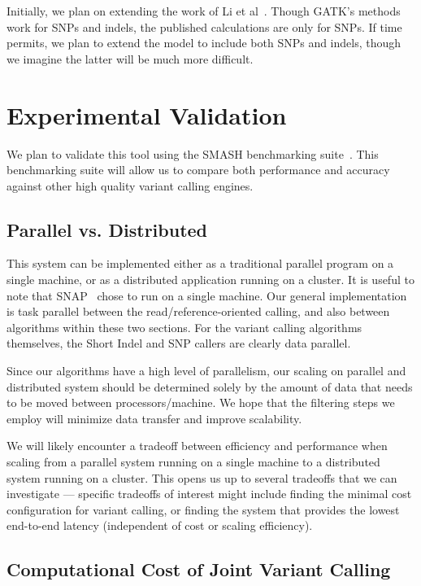 \documentclass[11pt]{article}
\begin{document}
Initially, we plan on extending the work of Li et al~\cite{li11}. Though GATK's methods work for SNPs and indels, the published calculations
are only for SNPs. If time permits, we plan to extend the model to include both SNPs and indels, though we imagine the latter will be much
more difficult.

\section{Experimental Validation}
\label{sec:experimental-validation}

We plan to validate this tool using the SMASH benchmarking suite~\cite{talwalkar13}. This benchmarking suite will allow us to
compare both performance and accuracy against other high quality variant calling engines.

\subsection{Parallel vs. Distributed}
\label{sec:parallel-vs-distributed}

This system can be implemented either as a traditional parallel program on a single machine, or as a distributed application
running on a cluster. It is useful to note that SNAP~\cite{zaharia11} chose to run on a single machine. Our general implementation
is task parallel between the read/reference-oriented calling, and also between algorithms within these two sections. For the
variant calling algorithms themselves, the Short Indel and SNP callers are clearly data parallel.

Since our algorithms have a high level of parallelism, our scaling on parallel and distributed system should be determined solely
by the amount of data that needs to be moved between processors/machine. We hope that the filtering steps we employ will
minimize data transfer and improve scalability.

We will likely encounter a tradeoff between efficiency and performance when scaling from a parallel system running on a single
machine to a distributed system running on a cluster. This opens us up to several tradeoffs that we can investigate --- specific
tradeoffs of interest might include finding the minimal cost configuration for variant calling, or finding the system that provides
the lowest end-to-end latency (independent of cost or scaling efficiency).

\subsection{Computational Cost of Joint Variant Calling}
\label{sec:computational-cost-joint}
\end{document}
